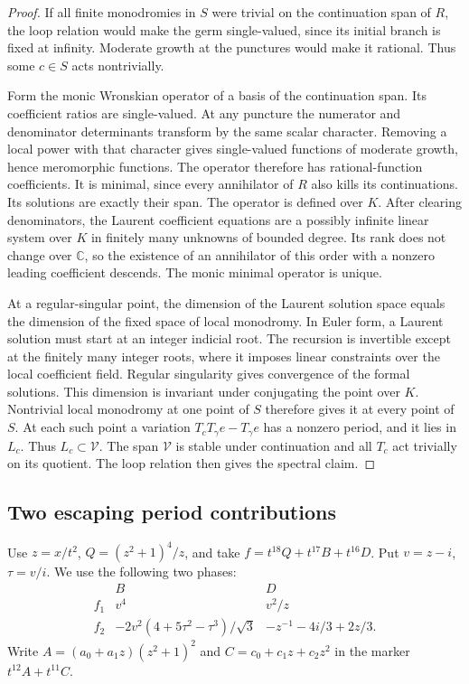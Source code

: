 \documentclass[11pt]{article}
\begin{document}
\begin{proof}
If all finite monodromies in \(S\) were trivial on the
continuation span of \(R\), the loop relation would make
the germ single-valued, since its initial branch is fixed
at infinity. Moderate growth at the punctures would make
it rational. Thus some \(c\in S\) acts nontrivially.

Form the monic Wronskian operator of a basis of the
continuation span. Its coefficient ratios are single-valued.
At any puncture the numerator and denominator determinants
transform by the same scalar character. Removing a local
power with that character gives single-valued functions of
moderate growth, hence meromorphic functions. The operator
therefore has rational-function coefficients. It is minimal,
since every annihilator of \(R\) also kills its continuations.
Its solutions are exactly their span. The operator is
defined over \(K\). After clearing denominators, the Laurent
coefficient equations are a possibly infinite linear system
over \(K\) in finitely many unknowns of bounded degree. Its
rank does not change over \(\mathbb C\), so the existence
of an annihilator of this order with a nonzero leading
coefficient descends. The monic minimal operator is unique.

At a regular-singular point, the dimension of the Laurent
solution space equals the dimension of the fixed space of
local monodromy. In Euler form, a Laurent solution must
start at an integer indicial root. The recursion is invertible
except at the finitely many integer roots, where it imposes
linear constraints over the local coefficient field.
Regular singularity gives convergence of the formal
solutions. This dimension is invariant under conjugating
the point over \(K\). Nontrivial local monodromy at one
point of \(S\) therefore gives it at every point of \(S\).
At each such point a variation \(T_cT_\gamma e-T_\gamma e\)
has a nonzero period, and it lies in \(L_c\). Thus
\(L_c\subset\mathcal V\). The span \(\mathcal V\) is stable
under continuation and all \(T_c\) act trivially on its
quotient. The loop relation then gives the spectral claim.
\end{proof}

\subsection{Two escaping period contributions}
\label{sec:two-escaping-phases}

Use \(z=x/t^2\), \(Q=(z^2+1)^4/z\), and take
\(f=t^{18}Q+t^{17}B+t^{16}D\). Put \(v=z-i\), \(\tau=v/i\).
We use the following two phases:
\[
\begin{array}{c|cc}
     & B & D\\ \hline
  f_1 & v^4 & v^2/z\\
  f_2 & -2v^2(4+5\tau^2-\tau^3)/\sqrt3 & -z^{-1}-4i/3+2z/3 .
\end{array}
\]
Write \(A=(a_0+a_1z)(z^2+1)^2\) and
\(C=c_0+c_1z+c_2z^2\) in the marker \(t^{12}A+t^{11}C\).
\end{document}
